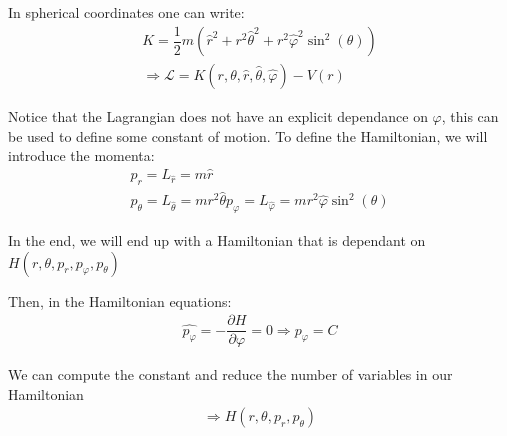 \par\bigskip
\noindent In spherical coordinates one can write:
\begin{equation*}
  \begin{gathered}
    K = \dfrac{1}{2}m\left(\hat{r}^2+r^2\hat{\theta}^2+r^2\hat{\varphi}^2\sin^2(\theta)\right)\\
    \Rightarrow\mathcal{L} = K(r,\theta, \hat{r},\hat{\theta},\hat{\varphi})-V(r)
  \end{gathered}
\end{equation*}\par
\noindent Notice that the Lagrangian does not have an explicit dependance on $\varphi$, this can be used to define some constant of motion. To define the Hamiltonian, we will introduce the momenta:
\begin{equation*}
  \begin{gathered}
    p_r = L_{\hat{r}} = m\hat{r}\\
    p_\theta = L_{\hat{\theta}} = mr^2\hat{\theta}
    p_\varphi= L_{\hat{\varphi}} = mr^2\hat{\varphi}\sin^2(\theta)
  \end{gathered}
\end{equation*}\par
\noindent In the end, we will end up with a Hamiltonian that is dependant on $H(r,\theta,p_r,p_\varphi,p_\theta)$
\par\bigskip
\noindent Then, in the Hamiltonian equations:
\begin{equation*}
  \begin{gathered}
    \hat{p_\varphi} = -\dfrac{\partial H}{\partial \varphi} = 0\Rightarrow p_\varphi = C
  \end{gathered}
\end{equation*}\par
\noindent We can compute the constant and reduce the number of variables in our Hamiltonian 
\begin{equation*}
  \begin{gathered}
    \Rightarrow H(r,\theta,p_r,p_\theta)
  \end{gathered}
\end{equation*}
